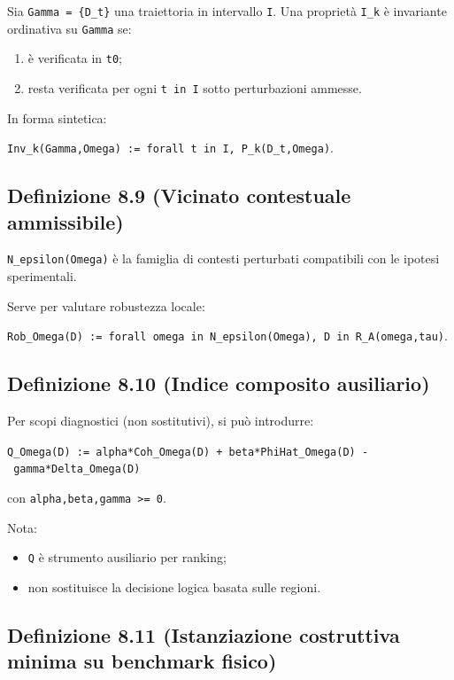 Sia \texttt{Gamma\ =\ \{D\_t\}} una traiettoria in intervallo \texttt{I}. Una proprietà \texttt{I\_k} è invariante ordinativa su \texttt{Gamma} se:

\begin{enumerate}
\def\labelenumi{\arabic{enumi}.}
\tightlist
\item
  è verificata in \texttt{t0};
\item
  resta verificata per ogni \texttt{t\ in\ I} sotto perturbazioni ammesse.
\end{enumerate}

In forma sintetica:

\texttt{Inv\_k(Gamma,Omega)\ :=\ forall\ t\ in\ I,\ P\_k(D\_t,Omega)}.

\subsection{Definizione 8.9 (Vicinato contestuale ammissibile)}

\texttt{N\_epsilon(Omega)} è la famiglia di contesti perturbati compatibili con le ipotesi sperimentali.

Serve per valutare robustezza locale:

\texttt{Rob\_Omega(D)\ :=\ forall\ omega\textquotesingle{}\ in\ N\_epsilon(Omega),\ D\ in\ R\_A(omega\textquotesingle{},tau\textquotesingle{})}.

\subsection{Definizione 8.10 (Indice composito ausiliario)}

Per scopi diagnostici (non sostitutivi), si può introdurre:

\texttt{Q\_Omega(D)\ :=\ alpha*Coh\_Omega(D)\ +\ beta*PhiHat\_Omega(D)\ -\ gamma*Delta\_Omega(D)}

con \texttt{alpha,beta,gamma\ \textgreater{}=\ 0}.

Nota:

\begin{itemize}
\tightlist
\item
  \texttt{Q} è strumento ausiliario per ranking;
\item
  non sostituisce la decisione logica basata sulle regioni.
\end{itemize}

\subsection{Definizione 8.11 (Istanziazione costruttiva minima su benchmark fisico)}

